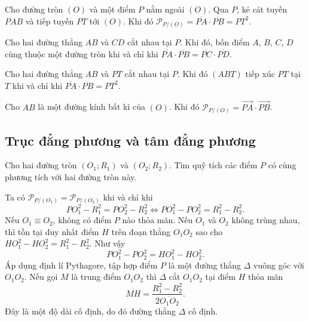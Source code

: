         \begin{property}
            Cho đường tròn \((O)\) và một điểm \(P\) nằm ngoài \((O)\). Qua \(P\), kẻ cát tuyến \(PAB\) và tiếp tuyến \(PT\) tới \((O)\). Khi đó \(\mathcal{P}_{P/(O)} = \overline{PA} \cdot \overline{PB} = PT^2\).
        \end{property}

        \begin{property}
            Cho hai đường thẳng \(AB\) và \(CD\) cắt nhau tại \(P\). Khi đó, bốn điểm \(A\), \(B\), \(C\), \(D\) cùng thuộc một đường tròn khi và chỉ khi \(\overline{PA} \cdot \overline{PB} = \overline{PC} \cdot \overline{PD}\).
        \end{property}

        \begin{property}
            Cho hai đường thẳng \(AB\) và \(PT\) cắt nhau tại \(P\). Khi đó \((ABT)\) tiếp xúc \(PT\) tại \(T\) khi và chỉ khi \(\overline{PA} \cdot \overline{PB} = PT^2\).
        \end{property}

        \begin{property}
            Cho \(AB\) là một đường kính bất kì của \((O)\). Khi đó \(\mathcal{P}_{P/(O)} = \overrightarrow{PA} \cdot \overrightarrow{PB}\).
        \end{property}

    \subsection{Trục đẳng phương và tâm đẳng phương}

        \begin{problemme}
            Cho hai đường tròn \((O_1;R_1)\) và \((O_2;R_2)\). Tìm quỹ tích các điểm \(P\) có cùng phương tích với hai đường tròn này.
        \end{problemme}
    
        \begin{solution}
            Ta có \(\mathcal{P}_{P/(O_1)} = \mathcal{P}_{P/(O_2)}\) khi và chỉ khi
            \[PO_1^2 - R_1^2 = PO_2^2 - R_2^2 \Leftrightarrow PO_1^2 - PO_2^2 = R_1^2 - R_2^2.\]
            Nếu \(O_1 \equiv O_2\), không có điểm \(P\) nào thỏa mãn. Nếu \(O_1\) và \(O_2\) không trùng nhau, thì tồn tại duy nhất điểm \(H\) trên đoạn thẳng \(O_1O_2\) sao cho \(HO_1^2 - HO_2^2 = R_1^2 - R_2^2\). Như vậy
            \[PO_1^2 - PO_2^2 = HO_1^2 - HO_2^2.\]
            Áp dụng định lí Pythagore, tập hợp điểm \(P\) là một đường thẳng \(\Delta\) vuông góc với \(O_1O_2\). Nếu gọi \(M\) là trung điểm \(O_1O_2\) thì \(\Delta\) cắt \(O_1O_2\) tại điểm \(H\) thỏa mãn
            \[\overline{MH} = \frac{R_1^2 - R_2^2}{2\overline{O_1O_2}}.\]
            Đây là một độ dài cố định, do đó đường thẳng \(\Delta\) cố định.
        \end{solution}
    
